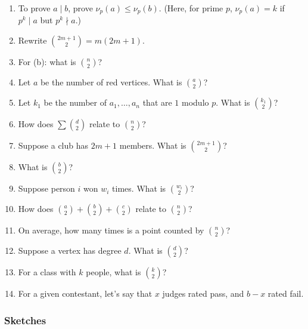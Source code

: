\documentclass[11pt,paper=letter]{scrartcl}
\begin{document}
\begin{enumerate}
\item \label{h:5} To prove $a \mid b$, prove $\nu_p(a) \le \nu_p(b)$. (Here, for prime $p$, $\nu_p(a) = k$ if $p^k \mid a$ but $p^k \nmid a$.)
\item \label{h:8} Rewrite $\binom{2m + 1}{2} = m(2m + 1)$.
\item \label{h:11} For (b): what is $\binom{n}{2}$?
\item \label{h:13} Let $a$ be the number of red vertices. What is $\binom{a}{2}$?
\item \label{h:6} Let $k_1$ be the number of $a_1, \ldots, a_n$ that are $1$ modulo $p$. What is $\binom{k_1}{2}$?
\item \label{h:4} How does $\sum \binom{d}{2}$ relate to $\binom{n}{2}$?
\item \label{h:7} Suppose a club has $2m + 1$ members. What is $\binom{2m + 1}{2}$?
\item \label{h:1} What is $\binom{b}{2}$?
\item \label{h:9} Suppose person $i$ won $w_i$ times. What is $\binom{w_i}{2}$?
\item \label{h:14} How does $\binom{a}{2} + \binom{b}{2} + \binom{c}{2}$ relate to $\binom{n}{2}$?
\item \label{h:12} On average, how many times is a point counted by $\binom{n}{2}$?
\item \label{h:3} Suppose a vertex has degree $d$. What is $\binom{d}{2}$?
\item \label{h:10} For a class with $k$ people, what is $\binom{k}{2}$?
\item \label{h:2} For a given contestant, let's say that $x$ judges rated pass, and $b - x$ rated fail.
\end{enumerate}

\subsubsection*{Sketches}
\end{document}
